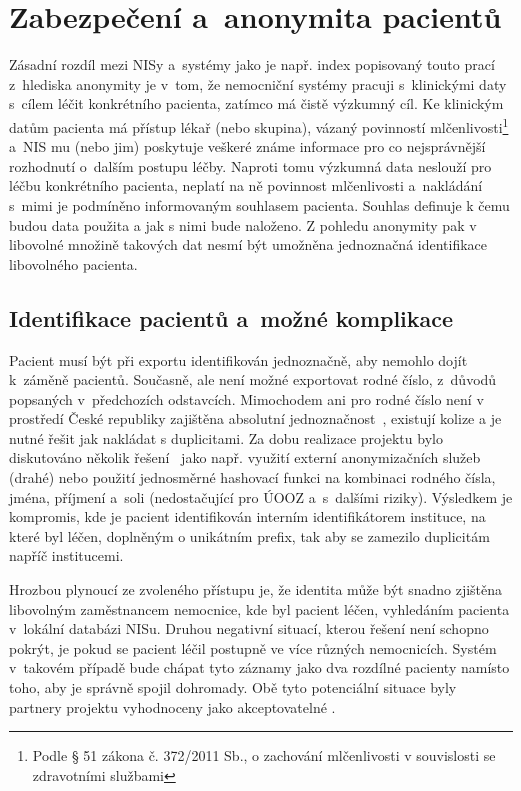 \section{Zabezpečení a~anonymita pacientů}
Zásadní rozdíl mezi NISy a~systémy jako je např. index \ProjectName popisovaný touto prací z~hlediska anonymity je v~tom, že nemocniční systémy pracuji s~klinickými daty s~cílem léčit konkrétního pacienta, zatímco \ProjectName má čistě výzkumný cíl. Ke klinickým datům pacienta má přístup lékař (nebo skupina), vázaný povinností mlčenlivosti\footnote{Podle § 51 zákona č. 372/2011 Sb., o zachování mlčenlivosti v souvislosti se zdravotními službami} a~NIS mu (nebo jim) poskytuje veškeré známe informace pro co nejsprávnější rozhodnutí o~dalším postupu léčby. Naproti tomu výzkumná data neslouží pro léčbu konkrétního pacienta, neplatí na ně povinnost mlčenlivosti a~nakládání s~mimi je podmíněno informovaným souhlasem pacienta. Souhlas definuje k čemu budou data použita a jak s nimi bude naloženo. Z pohledu anonymity pak v libovolné množině takových dat nesmí být umožněna jednoznačná identifikace libovolného pacienta.

\subsection{Identifikace pacientů a~možné komplikace}
Pacient musí být při exportu identifikován jednoznačně, aby nemohlo dojít k~záměně pacientů. Současně, ale není možné exportovat rodné číslo, z~důvodů popsaných v~předchozích odstavcích. Mimochodem ani pro rodné číslo není v prostředí České republiky zajištěna absolutní jednoznačnost~\cite{RodnaCisla}, existují kolize a je nutné řešit jak nakládat s duplicitami.
Za dobu realizace projektu bylo diskutováno několik řešení~\cite{ARCH_2014_1_25} jako např. využití externí anonymizačních služeb (drahé) nebo použití jednosměrné hashovací funkci na kombinaci rodného čísla, jména, příjmení a~soli (nedostačující pro ÚOOZ a~s~dalšími riziky). 
Výsledkem je kompromis, kde je pacient identifikován interním identifikátorem instituce, na které byl léčen, doplněným o unikátním prefix, tak aby se zamezilo duplicitám napříč institucemi.

Hrozbou plynoucí ze zvoleného přístupu je, že identita může být snadno zjištěna libovolným zaměstnancem nemocnice, kde byl pacient léčen, vyhledáním pacienta v~lokální databázi NISu. Druhou negativní situací, kterou řešení není schopno pokrýt, je pokud se pacient léčil postupně ve více různých nemocnicích. Systém v~takovém případě bude chápat tyto záznamy jako dva rozdílné pacienty namísto toho, aby je správně spojil dohromady. Obě tyto potenciální situace byly partnery projektu vyhodnoceny jako akceptovatelné .


